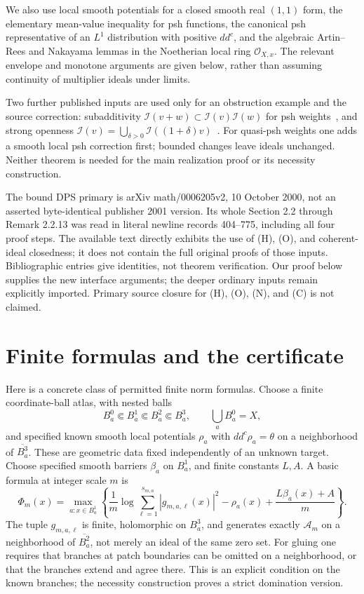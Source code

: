 \documentclass[11pt]{article}
\newcommand{\I}{\mathcal I}
\newcommand{\A}{\mathcal A}
\newcommand{\OO}{\mathcal O}
\theoremstyle{definition}
\begin{document}
We also use local smooth potentials for a closed smooth real $(1,1)$
form, the elementary mean-value inequality for psh functions, the
canonical psh representative of an $L^1$ distribution with positive
$dd^c$, and the algebraic Artin--Rees and Nakayama lemmas in the
Noetherian local ring $\OO_{X,x}$. The relevant envelope and monotone
arguments are given below, rather than assuming continuity of
multiplier ideals under limits.

Two further published inputs are used only for an obstruction example
and the source correction: subadditivity
$\I(v+w)\subset\I(v)\I(w)$ for psh weights~\cite{DEL00}, and strong
openness $\I(v)=\bigcup_{\delta>0}\I((1+\delta)v)$~\cite{GZ15}.
For quasi-psh weights one adds a smooth local psh correction first;
bounded changes leave ideals unchanged. Neither theorem is needed
for the main realization proof or its necessity construction.

The bound DPS primary is arXiv math/0006205v2, 10 October 2000,
not an asserted byte-identical publisher 2001 version. Its whole
Section 2.2 through Remark 2.2.13 was read in literal newline
records 404--775, including all four proof steps. The available
text directly exhibits the use of (H), (O), and coherent-ideal
closedness; it does not contain the full original proofs of those
inputs. Bibliographic entries give identities, not theorem
verification. Our proof below supplies the new interface arguments;
the deeper ordinary inputs remain explicitly imported. Primary
source closure for (H), (O), (N), and (C) is not claimed.

\section{Finite formulas and the certificate}\label{sec:certificate}
Here is a concrete class of permitted finite norm formulas. Choose
a finite coordinate-ball atlas, with nested balls
\[
 B_a^0\Subset B_a^1\Subset B_a^2\Subset B_a^3,
 \qquad \bigcup_a B_a^0=X,
\]
and specified known smooth local potentials $\rho_a$ with
$dd^c\rho_a=\theta$ on a neighborhood of $\overline{B_a^3}$.
These are geometric data fixed independently of an unknown target.
Choose specified smooth barriers $\beta_a$ on $B_a^1$, and finite
constants $L,A$. A basic formula at integer scale $m$ is
\begin{equation}\label{eq:finite}
 \Phi_m(x)=\max_{a:x\in B_a^1}
 \left\{\frac1m\log\sum_{\ell=1}^{s_{m,a}}|g_{m,a,\ell}(x)|^2
       -\rho_a(x)+\frac{L\beta_a(x)+A}{m}\right\}.
\end{equation}
The tuple $g_{m,a,\ell}$ is finite, holomorphic on $B_a^3$, and
generates exactly $\A_m$ on a neighborhood of
$\overline{B_a^2}$, not merely an ideal of the same zero set.
For gluing one requires that branches at patch boundaries can be
omitted on a neighborhood, or that the branches extend and agree
there. This is an explicit condition on the known branches; the
necessity construction proves a strict domination version.
\end{document}
